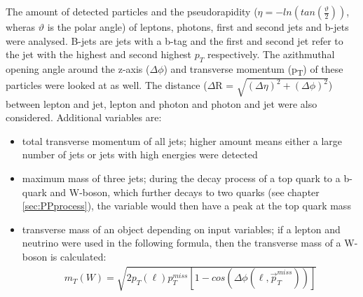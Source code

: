 \documentclass[11pt]{scrartcl}
\begin{document}
The amount of detected particles and the pseudorapidity ($\eta = -ln(tan(\frac{\vartheta}{2}))$, wheras $\vartheta$ is the polar angle) of leptons, photons, first and second jets and b-jets were analysed.  B-jets are jets with a b-tag and the first and second jet refer to the jet with the highest and second highest $p_T$ respectively. The azithmuthal opening angle around the z-axis ($\Delta\phi$) and transverse momentum (p\textsubscript{T}) of these particles were looked at as well. The distance ($\Delta$R = $\sqrt{(\Delta\eta)^2 +(\Delta\phi)^2}$) between lepton and jet, lepton and photon and photon and jet were also considered. 
Additional variables are:
\begin{itemize}
  \item total transverse momentum of all jets; higher amount means either a large number of jets or jets with high energies were detected
  \item maximum mass of three jets; during the decay process of a top quark to a b-quark and W-boson, which further decays to two quarks (see chapter \ref{sec:PPprocess}), the variable would then have a peak at the top quark mass  
  \item transverse mass of an object depending on input variables; if a lepton and neutrino were used in the following formula, then the transverse mass of a W-boson is calculated:
	  \begin{align*}
			m_T(W) = \sqrt{2p_T(\ell)p_T^{miss}[1 - cos(\Delta\phi(\ell, \vec{p}_T^{miss}))]}
		\end{align*}
  

\end{itemize}
\end{document}
